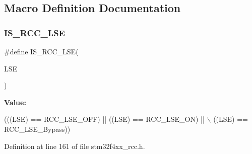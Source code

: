 \subsection{Macro Definition Documentation}
\mbox{\label{group___r_c_c___l_s_e___configuration_ga95d2678bf8f46e932e7cba75619a4d2c}} 
\subsubsection{\texorpdfstring{I\+S\+\_\+\+R\+C\+C\+\_\+\+L\+SE}{IS\_RCC\_LSE}}
{\footnotesize\ttfamily \#define I\+S\+\_\+\+R\+C\+C\+\_\+\+L\+SE(\begin{DoxyParamCaption}\item[{}]{L\+SE }\end{DoxyParamCaption})}

{\bfseries Value\+:}
\begin{DoxyCode}
(((LSE) == RCC\_LSE\_OFF) || ((LSE) == RCC\_LSE\_ON) || \(\backslash\)
                         ((LSE) == RCC\_LSE\_Bypass))
\end{DoxyCode}


Definition at line 161 of file stm32f4xx\+\_\+rcc.\+h.

